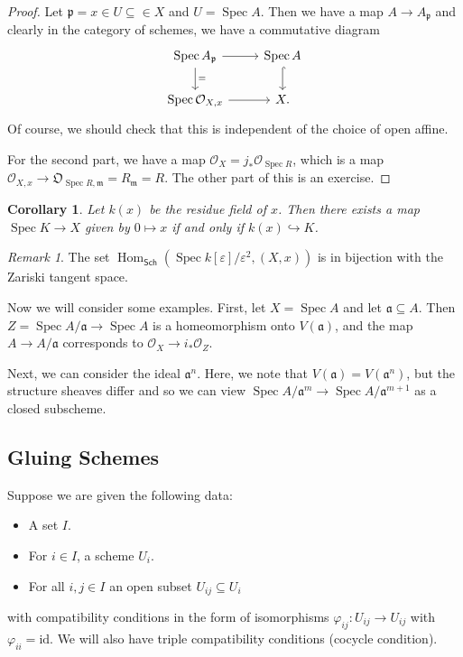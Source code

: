 \documentclass[leqno, openany]{memoir}
\newtheorem{cor}[thm]{Corollary}
\theoremstyle{definition}
\theoremstyle{remark}
\newtheorem{rmk}[thm]{Remark}
\theoremstyle{plain}
\theoremstyle{definition}
\theoremstyle{remark}
\newcommand{\ep}{\varepsilon}
\newcommand{\mc}[1]{\mathcal{#1}}
\newcommand{\mf}[1]{\mathfrak{#1}}
\newcommand{\mr}[1]{\mathrm{#1}}
\newcommand{\ms}[1]{\mathsf{#1}}
\DeclareMathOperator{\Hom}{Hom}
\DeclareMathOperator{\Spec}{Spec}
\begin{document}
\begin{proof}
    Let $\mf{p} = x \in U \subseteq \in X$ and $U = \Spec A$. Then we have a map $A \to A_{\mf{p}}$ and clearly in the category of schemes, we have a commutative diagram
    \begin{equation*}
    \begin{tikzcd}
        \Spec A_{\mf{p}} \arrow{r} \arrow{d}{=} & \Spec A \arrow[hookrightarrow]{d} \\
        \Spec \mc{O}_{X,x} \arrow{r} & X.
    \end{tikzcd}
    \end{equation*}
    Of course, we should check that this is independent of the choice of open affine.

    For the second part, we have a map $\mc{O}_{X} = j_* \mc{O}_{\Spec R}$, which is a map $\mc{O}_{X,x} \to \mf{O}_{\Spec R, \mf{m}} = R_{\mf{m}} = R$. The other part of this is an exercise.
\end{proof}

\begin{cor}
    Let $k(x)$ be the residue field of $x$. Then there exists a map $\Spec K \to X$ given by $0 \mapsto x$ if and only if $k(x) \hookrightarrow K$.
\end{cor}

\begin{rmk}
    The set $\Hom_{\ms{Sch}}(\Spec k[\ep]/\ep^2, (X, x))$ is in bijection with the Zariski tangent space.
\end{rmk}

Now we will consider some examples. First, let $X = \Spec A$ and let $\mf{a} \subseteq A$. Then $Z = \Spec A/\mf{a} \to \Spec A$ is a homeomorphism onto $V(\mf{a})$, and the map $A \to A/\mf{a}$ corresponds to $\mc{O}_X \to i_* \mc{O}_Z$.

Next, we can consider the ideal $\mf{a}^n$. Here, we note that $V(\mf{a}) = V(\mf{a}^n)$, but the structure sheaves differ and so we can view $\Spec A/\mf{a}^m \to \Spec A/\mf{a}^{m+1}$ as a closed subscheme.

\subsection{Gluing Schemes}%
\label{sub:gluing_schemes}

Suppose we are given the following data:
\begin{itemize}
    \item A set $I$.
    \item For $i \in I$, a scheme $U_i$.
    \item For all $i,j \in I$ an open subset $U_{ij} \subseteq U_i$
\end{itemize}
with compatibility conditions in the form of isomorphisms $\varphi_{ij} \colon U_{ij} \to U_{ij}$ with $\varphi_{ii} = \mr{id}$. We will also have triple compatibility conditions (cocycle condition).
\end{document}
